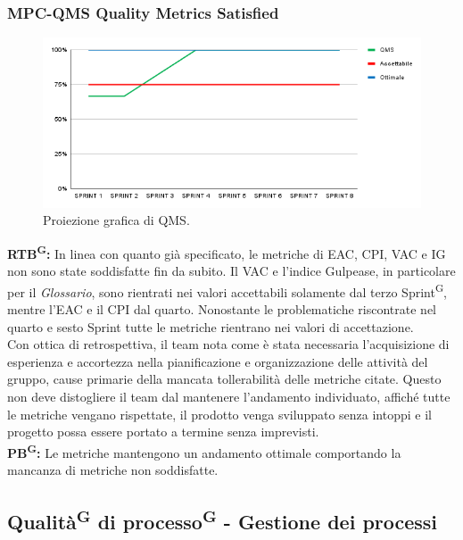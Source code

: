\documentclass[8pt]{article}
\newcommand{\glossterm}[1]{#1\textsuperscript{G}} %
\begin{document}
\subsubsection{MPC-QMS Quality Metrics Satisfied}
\begin{figure}[h!]
    \centering
    \includegraphics[width=1\textwidth]{images_pdq/QMS.png}
    \caption{Proiezione grafica di QMS.}
    \label{fig:Proiezione grafica di QMS}
\end{figure}
\textbf{\glossterm{RTB}:} In linea con quanto già specificato, le metriche di EAC, CPI, VAC e IG non sono state soddisfatte fin da subito. Il VAC e l'indice Gulpease, in particolare per il \textit{Glossario}, sono rientrati nei valori accettabili solamente dal terzo \glossterm{Sprint}, mentre l'EAC e il CPI dal quarto. Nonostante le problematiche riscontrate nel quarto e sesto Sprint tutte le metriche rientrano nei valori di accettazione. \\Con ottica di retrospettiva, il team nota come è stata necessaria l'acquisizione di esperienza e accortezza nella pianificazione e organizzazione delle attività del gruppo, cause primarie della mancata tollerabilità delle metriche citate. Questo non deve distogliere il team dal mantenere l'andamento individuato, affiché tutte le metriche vengano rispettate, il prodotto venga sviluppato senza intoppi e il progetto possa essere portato a termine senza imprevisti.\\
\textbf{\glossterm{PB}:} Le metriche mantengono un andamento ottimale comportando la mancanza di metriche non soddisfatte.
\clearpage
\subsection{\glossterm{Qualità} di \glossterm{processo} - Gestione dei processi}
\end{document}
